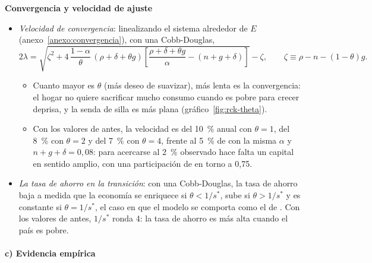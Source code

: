 \documentclass[11pt]{article}
\begin{document}
\begin{anotaciones}
\textbf{Convergencia y velocidad de ajuste}
\begin{itemize}
\item \emph{Velocidad de convergencia}: linealizando el sistema alrededor de $E$ (anexo~\ref{anexo:convergencia}), con una Cobb-Douglas\nocite{BarroSalaiMartin2004},
  \[2\lambda=\sqrt{\zeta^2+4\,\frac{1-\alpha}{\theta}\,(\rho+\delta+\theta g)\left[\frac{\rho+\delta+\theta g}{\alpha}-(n+g+\delta)\right]}-\zeta,\qquad \zeta\equiv\rho-n-(1-\theta)g.\]
  \begin{itemize}
  \item Cuanto mayor es $\theta$ (más deseo de suavizar), más lenta es la convergencia: el hogar no quiere sacrificar mucho consumo cuando es pobre para crecer deprisa, y la senda de silla es más plana (gráfico~\ref{fig:rck-theta}).
  \item Con los valores de antes, la velocidad es del 10~\% anual con $\theta=1$, del 8~\% con $\theta=2$ y del 7~\% con $\theta=4$, frente al 5~\% de  con la misma $\alpha$ y $n+g+\delta=0{,}08$: para acercarse al 2~\% observado hace falta un capital en sentido amplio, con una participación de en torno a 0,75.
  \end{itemize}
\item \emph{La tasa de ahorro en la transición}: con una Cobb-Douglas, la tasa de ahorro baja a medida que la economía se enriquece si $\theta<1/s^*$, sube si $\theta>1/s^*$ y es constante si $\theta=1/s^*$, el caso en que el modelo se comporta como el de \nocite{BarroSalaiMartin2004}. Con los valores de antes, $1/s^*$ ronda 4: la tasa de ahorro es más alta cuando el país es pobre.
\end{itemize}

\begin{figuracaja}
\caption{La senda de silla según el deseo de suavizar el consumo: con $\theta$ alto es más plana y la convergencia, más lenta}\label{fig:rck-theta}
\end{figuracaja}
\end{anotaciones}

\paragraph{c) Evidencia empírica}
\end{document}
